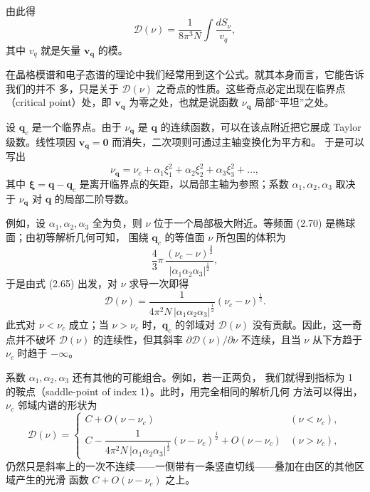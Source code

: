 由此得
\begin{equation*}
\mathcal{D}(\nu) = \frac{1}{8\pi^3 N} \int \frac{dS_\nu}{v_q},
\tag{2.69}
\end{equation*}
其中 $v_q$ 就是矢量 $\mathbf{v}_{\mathbf{q}}$ 的模。

在晶格模谱和电子态谱的理论中我们经常用到这个公式。就其本身而言，它能告诉我们的并不
多，只是关于 $\mathcal{D}(\nu)$ 之奇点的性质。这些奇点必定出现在临界点（critical
point）处，即 $\mathbf{v}_{\mathbf{q}}$ 为零之处，也就是说函数
$\nu_{\mathbf{q}}$ 局部“平坦”之处。

设 $\mathbf{q}_c$ 是一个临界点。由于 $\nu_{\mathbf{q}}$ 是 $\mathbf{q}$
的连续函数，可以在该点附近把它展成 Taylor 级数。线性项因
$\mathbf{v}_{\mathbf{q}} = \mathbf{0}$ 而消失，二次项则可通过主轴变换化为平方和。
于是可以写出
\begin{equation*}
\nu_{\mathbf{q}} = \nu_c + \alpha_1 \xi_1^2 + \alpha_2 \xi_2^2
+ \alpha_3 \xi_3^2 + \ldots,
\tag{2.70}
\end{equation*}
其中 $\boldsymbol{\xi} = \mathbf{q} - \mathbf{q}_c$
是离开临界点的矢距，以局部主轴为参照；系数 $\alpha_1, \alpha_2, \alpha_3$
取决于 $\nu_{\mathbf{q}}$ 对 $\mathbf{q}$ 的局部二阶导数。

例如，设 $\alpha_1, \alpha_2, \alpha_3$ 全为负，则 $\nu$
位于一个局部极大附近。等频面 (2.70) 是椭球面；由初等解析几何可知，
围绕 $\mathbf{q}_c$ 的等值面 $\nu$ 所包围的体积为
\begin{equation*}
\frac{4}{3}\pi\,
\frac{(\nu_c - \nu)^{\frac{3}{2}}}{|\alpha_1 \alpha_2 \alpha_3|^{\frac{1}{2}}},
\tag{2.71}
\end{equation*}
于是由式 (2.65) 出发，对 $\nu$ 求导一次即得
\begin{equation*}
\mathcal{D}(\nu) =
\frac{1}{4\pi^2 N\,|\alpha_1 \alpha_2 \alpha_3|^{\frac{1}{2}}}
(\nu_c - \nu)^{\frac{1}{2}}.
\tag{2.72}
\end{equation*}
此式对 $\nu < \nu_c$ 成立；当 $\nu > \nu_c$ 时，$\mathbf{q}_c$
的邻域对 $\mathcal{D}(\nu)$ 没有贡献。因此，这一奇点并不破坏
$\mathcal{D}(\nu)$ 的连续性，但其斜率 $\partial\mathcal{D}(\nu)/\partial\nu$
不连续，且当 $\nu$ 从下方趋于 $\nu_c$ 时趋于 $-\infty$。

系数 $\alpha_1, \alpha_2, \alpha_3$ 还有其他的可能组合。例如，若一正两负，
我们就得到指标为 1 的鞍点（saddle-point of index 1）。此时，用完全相同的解析几何
方法可以得出，$\nu_c$ 邻域内谱的形状为
\begin{equation*}
\mathcal{D}(\nu) = \left\{
\begin{array}{ll}
C + O(\nu - \nu_c) & (\nu < \nu_c), \\[6pt]
C - \dfrac{1}{4\pi^2 N\,|\alpha_1 \alpha_2 \alpha_3|^{\frac{1}{2}}}
(\nu - \nu_c)^{\frac{1}{2}} + O(\nu - \nu_c) & (\nu > \nu_c),
\end{array}
\right.
\tag{2.73}
\end{equation*}
仍然只是斜率上的一次不连续——一侧带有一条竖直切线——叠加在由区的其他区域产生的光滑
函数 $C + O(\nu - \nu_c)$ 之上。

